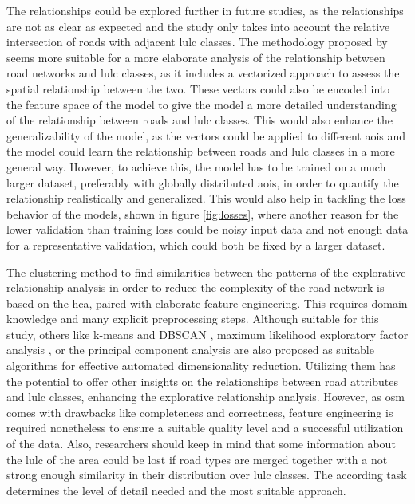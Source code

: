 The relationships could be explored further in future studies, as the relationships are not as clear as expected and the study only takes into account the relative intersection of roads with adjacent \gls{lulc} classes. The methodology proposed by \textcite{Atwal.Anderson.ea2022} seems more suitable for a more elaborate analysis of the relationship between road networks and \gls{lulc} classes, as it includes a vectorized approach to assess the spatial relationship between the two. These vectors could also be encoded into the feature space of the model to give the model a more detailed understanding of the relationship between roads and \gls{lulc} classes. This would also enhance the generalizability of the model, as the vectors could be applied to different \glspl{aoi} and the model could learn the relationship between roads and \gls{lulc} classes in a more general way. However, to achieve this, the model has to be trained on a much larger dataset, preferably with globally distributed \glspl{aoi}, in order to quantify the relationship realistically and generalized. This would also help in tackling the loss behavior of the models, shown in figure \ref{fig:losses}, where another reason for the lower validation than training loss could be noisy input data and not enough data for a representative validation, which could both be fixed by a larger dataset.

The clustering method to find similarities between the patterns of the explorative relationship analysis in order to reduce the complexity of the road network is based on the \gls{hca}, paired with elaborate feature engineering. This requires domain knowledge and many explicit preprocessing steps. Although suitable for this study, others like k-means and DBSCAN \autocite{Montazeri.Lilienthal.ea2021}, maximum likelihood exploratory factor analysis \autocite{Petrakis.Norman.ea2021}, or the principal component analysis \autocite{Dharani.Sreenivasulu2019} are also proposed as suitable algorithms for effective automated dimensionality reduction. Utilizing them has the potential to offer other insights on the relationships between road attributes and \gls{lulc} classes, enhancing the explorative relationship analysis. However, as \gls{osm} comes with drawbacks like completeness and correctness, feature engineering is required nonetheless to ensure a suitable quality level and a successful utilization of the data. Also, researchers should keep in mind that some information about the \gls{lulc} of the area could be lost if road types are merged together with a not strong enough similarity in their distribution over \gls{lulc} classes. The according task determines the level of detail needed and the most suitable approach.

